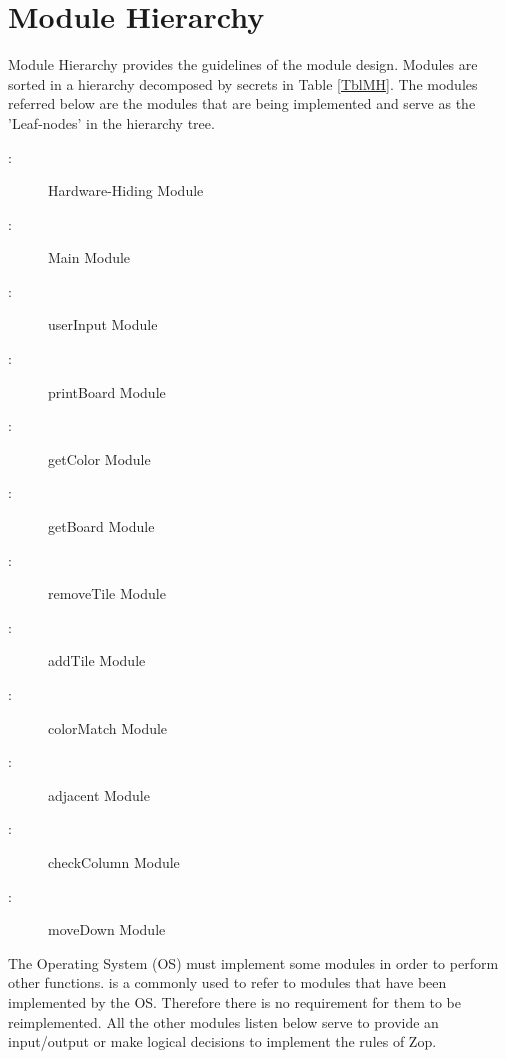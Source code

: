 \section{Module Hierarchy} \label{SecMH}

Module Hierarchy provides the guidelines of the module design. Modules are sorted
in a hierarchy decomposed by secrets in Table \ref{TblMH}. The modules referred below are the modules that are being implemented and serve as the 'Leaf-nodes' in the hierarchy tree.

\begin{description}
\item [ \mthemnum \label{mHH}:] Hardware-Hiding Module
\item [ \mthemnum \label{mMain}:] Main Module
\item [ \mthemnum \label{mUI}:] userInput Module
\item [ \mthemnum \label{mPrintB}:] printBoard Module
\item [ \mthemnum \label{mColor}:] getColor Module
\item [ \mthemnum \label{mGetB}:] getBoard Module
\item [ \mthemnum \label{mRemove}:] removeTile Module
\item [ \mthemnum \label{mAdd}:] addTile Module
\item [ \mthemnum \label{mMatch}:] colorMatch Module
\item [ \mthemnum \label{mAdj}:] adjacent Module
\item [ \mthemnum \label{mCol}:] checkColumn Module
\item [ \mthemnum \label{mDown}:] moveDown Module

\end{description}

The Operating System (OS) must implement some modules in order to perform other functions.  is a commonly used to refer to modules that have been implemented by the OS.  Therefore there is no requirement for them to be reimplemented. All the other modules listen below serve to provide an input/output or make logical decisions to implement the rules of Zop.
